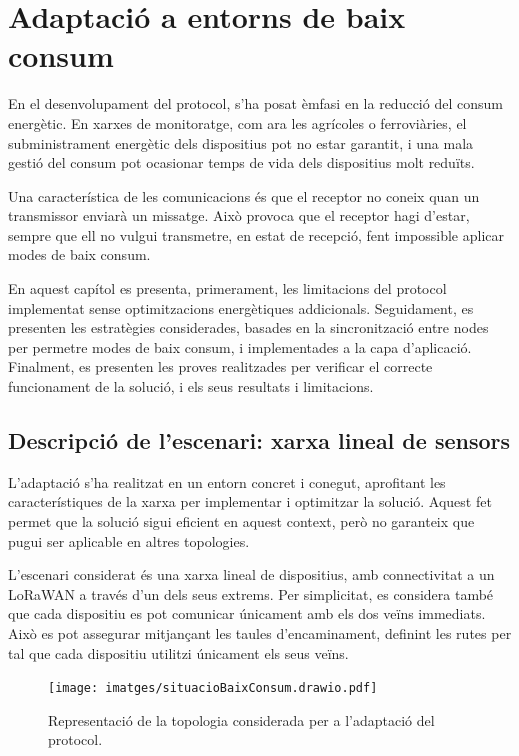 \documentclass{tfgitic}[2024/07/01]
\begin{document}
{\chapter{Adaptació a entorns de baix consum}
\label{chap:adaptacio_baix_consum}
En el desenvolupament del protocol, s'ha posat èmfasi en la reducció del consum energètic. En xarxes de monitoratge, com ara les agrícoles o ferroviàries, el subministrament energètic dels dispositius pot no estar garantit, i una mala gestió del consum pot ocasionar temps de vida dels dispositius molt reduïts.

Una característica de les comunicacions és que el receptor no coneix quan un transmissor enviarà un missatge. Això provoca que el receptor hagi d'estar, sempre que ell no vulgui transmetre, en estat de recepció, fent impossible aplicar modes de baix consum.

En aquest capítol es presenta, primerament, les limitacions del protocol implementat sense optimitzacions energètiques addicionals. Seguidament, es presenten les estratègies considerades, basades en la sincronització entre nodes per permetre modes de baix consum, i implementades a la capa d'aplicació. Finalment, es presenten les proves realitzades per verificar el correcte funcionament de la solució, i els seus resultats i limitacions.

\section{Descripció de l'escenari: xarxa lineal de sensors}
L'adaptació s'ha realitzat en un entorn concret i conegut, aprofitant les característiques de la xarxa per implementar i optimitzar la solució. Aquest fet permet que la solució sigui eficient en aquest context, però no garanteix que pugui ser aplicable en altres topologies. 

L'escenari considerat és una xarxa lineal de dispositius, amb connectivitat a un  LoRaWAN a través d'un dels seus extrems. Per simplicitat, es considera també que cada dispositiu es pot comunicar únicament amb els dos veïns immediats. Això es pot assegurar mitjançant les taules d'encaminament, definint les rutes per tal que cada dispositiu utilitzi únicament els seus veïns. 

\begin{figure}
    \centering
    \texttt{[image: imatges/situacioBaixConsum.drawio.pdf]}
    \caption{Representació de la topologia considerada per a l'adaptació del protocol.}
    \label{fig:topologia_baix_consum}
\end{figure}

}
\end{document}
